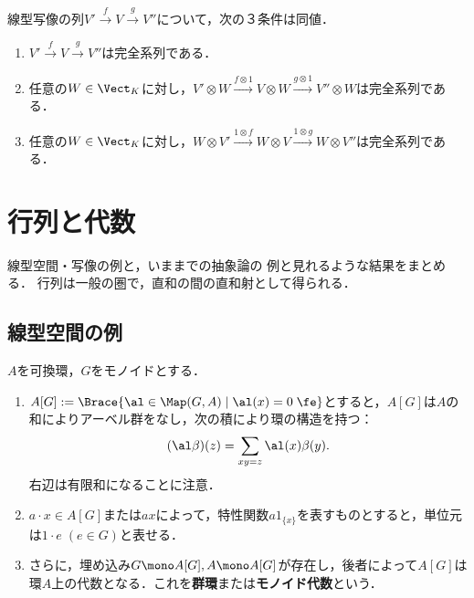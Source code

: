 \documentclass[uplatex, dvipdfmx]{jsreport}
\begin{document}
\begin{proposition}[テンソル積による完全系列の特徴付け]
    線型写像の列$V'\xrightarrow{f}V\xrightarrow{g}V''$について，次の３条件は同値．
    \begin{enumerate}
        \item $V'\xrightarrow{f}V\xrightarrow{g}V''$は完全系列である．
        \item 任意の$W\in\Vect_K$に対し，$V'\otimes W\xrightarrow{f\otimes 1}V\otimes W\xrightarrow{g\otimes 1}V''\otimes W$は完全系列である．
        \item 任意の$W\in\Vect_K$に対し，$W\otimes V'\xrightarrow{1\otimes f}W\otimes V\xrightarrow{1\otimes g}W\otimes V''$は完全系列である．
    \end{enumerate}
\end{proposition}

\section{行列と代数}

\begin{tcolorbox}[colframe=ForestGreen, colback=ForestGreen!10!white,breakable,colbacktitle=ForestGreen!40!white,coltitle=black,fonttitle=\bfseries\sffamily,
title=]
    線型空間・写像の例と，いままでの抽象論の
    例と見れるような結果をまとめる．
    行列は一般の圏で，直和の間の直和射として得られる．
\end{tcolorbox}

\subsection{線型空間の例}

\begin{definition}
    $A$を可換環，$G$をモノイドとする．
    \begin{enumerate}
        \item $A[G]:=\Brace{\al\in\Map(G,A)\mid\al(x)=0\;\fe}$とすると，$A[G]$は$A$の和によりアーベル群をなし，次の積により環の構造を持つ：
        \[(\al\beta)(z)=\sum_{xy=z}\al(x)\beta(y).\]
        右辺は有限和になることに注意．
        \item $a\cdot x\in A[G]$または$ax$によって，特性関数$a1_{\{x\}}$を表すものとすると，単位元は$1\cdot e\;(e\in G)$と表せる．
        \item さらに，埋め込み$G\mono A[G],A\mono A[G]$が存在し，後者によって$A[G]$は環$A$上の代数となる．これを\textbf{群環}または\textbf{モノイド代数}という．
    \end{enumerate}
\end{definition}
\end{document}
